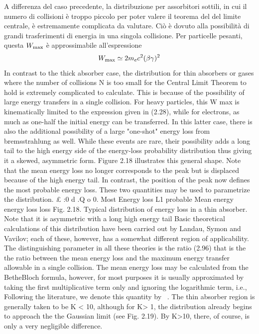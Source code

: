 {\begin{approfondimento}
        A differenza del caso precedente, la distribuzione per assorbitori sottili, in cui il numero di collisioni è troppo piccolo per poter valere il teorema del del limite centrale, è estremamente complicata da valutare. Ciò è dovuto alla possibilità di grandi trasferimenti di energia in una singola collisione. Per particelle pesanti, questa $W_{\rm max}$ è approssimabile all'espressione
        \begin{equation*}
            W_{\rm max} \simeq 2 m_e c^2 (\beta\gamma)^2
        \end{equation*}
        In contrast to the thick absorber case, the distribution for thin absorbers or gases where
the number of collisions N is too small for the Central Limit Theorem to hold is extremely
complicated to calculate. This is because of the possibility of large energy
transfers in a single collision. For heavy particles, this W max is kinematically limited to
the expression given in (2.28), while for electrons, as much as one-half the initial energy
can be transferred. In this latter case, there is also the additional possibility of a large
"one-shot" energy loss from bremsstrahlung as well. While these events are rare, their
possibility adds a long tail to the high energy side of the energy-loss probability distribution
thus giving it a skewed, asymmetric form. Figure 2.18 illustrates this general
shape. Note that the mean energy loss no longer corresponds to the peak but is displaced
because of the high energy tail. In contrast, the position of the peak now defines
the most probable energy loss. These two quantities may be used to parametrize the
distribution.
£
:0
d
.Q
o
0.
Most Energy loss L1
probable Mean
energy energy
loss loss
Fig. 2.18. Typical distribution of energy loss in a
thin absorber. Note that it is asymmetric with a long
high energy tail
Basic theoretical calculations of this distribution have been carried out by Landau,
Symon and Vavilov; each of these, however, has a somewhat different region of applicability.
The distinguishing parameter in all these theories is the ratio
(2.96)
that is the the ratio between the mean energy loss and the maximum energy transfer allowable
in a single collision. The mean energy loss may be calculated from the BetheBloch
formula, however, for most purposes it is usually approximated by taking the
first multiplicative term only and ignoring the logarithmic term, i.e.,
        Following the literature, we denote this quantity by ~. The thin absorber region is
generally taken to be K < 10, although for K> 1, the distribution already begins to approach
the the Gaussian limit (see Fig. 2.19). By K>10, there, of course, is only a very
negligible difference.
    \end{approfondimento}
    
    } %

